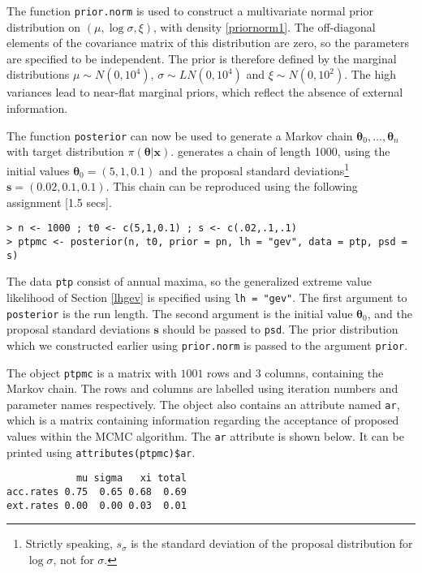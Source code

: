 \documentclass[11pt,a4paper]{article}
\newcommand{\bs}{\boldsymbol}
\begin{document}
The function \verb+prior.norm+ is used to construct a multivariate
normal prior distribution on $(\mu, \log \sigma, \xi)$, with density
\eqref{priornorm1}.  The off-diagonal elements of the covariance matrix
of this distribution are zero, so the parameters are specified to be
independent.  The prior is therefore defined by the marginal
distributions $\mu \sim N(0,10^4)$, $\sigma \sim LN(0,10^4)$ and $\xi
\sim N(0,10^2)$.  The high variances lead to near-flat marginal
priors, which reflect the absence of external information.

The function \verb+posterior+ can now be used to generate a Markov
chain $\bs{\theta}_0,\dots,\bs{\theta}_n$ with target distribution
$\pi(\bs{\theta}|\bs{x})$.  \citet{cole01} generates a chain of length
1000, using the initial values $\bs{\theta}_0 = (5,1,0.1)$ and the
proposal standard deviations\footnote{Strictly speaking, $s_\sigma$ is
  the standard deviation of the proposal distribution for $\log
  \sigma$, not for $\sigma$.} $\bs{s} = (0.02,0.1,0.1)$.  This chain
can be reproduced using the following assignment [1.5 secs].

\begin{verbatim}
> n <- 1000 ; t0 <- c(5,1,0.1) ; s <- c(.02,.1,.1)
> ptpmc <- posterior(n, t0, prior = pn, lh = "gev", data = ptp, psd = s)
\end{verbatim}

The data \verb+ptp+ consist of annual maxima, so the generalized
extreme value likelihood of Section \ref{lhgev} is specified using
\verb+lh = "gev"+.  The first argument to \verb+posterior+ is the run
length.  The second argument is the initial value $\bs{\theta}_0$, and
the proposal standard deviations $\bs{s}$ should be passed to
\verb+psd+.  The prior distribution which we constructed earlier using
\verb+prior.norm+ is passed to the argument \verb+prior+.

The object \verb+ptpmc+ is a matrix with $1001$ rows and $3$ columns,
containing the Markov chain.  The rows and columns are labelled using
iteration numbers and parameter names respectively.  The object also
contains an attribute named \verb+ar+, which is a matrix containing
information regarding the acceptance of proposed values within the
MCMC algorithm.  The \verb+ar+ attribute is shown below.  It can be
printed using \verb+attributes(ptpmc)$ar+.

\begin{verbatim}
            mu sigma   xi total
acc.rates 0.75  0.65 0.68  0.69
ext.rates 0.00  0.00 0.03  0.01
\end{verbatim}
\end{document}
